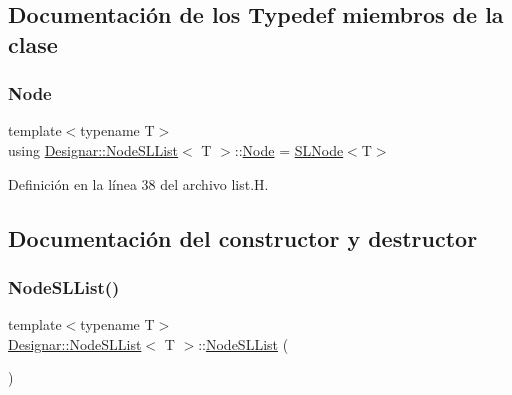 \subsection{Documentación de los \textquotesingle{}Typedef\textquotesingle{} miembros de la clase}
\mbox{\label{class_designar_1_1_node_s_l_list_a41963019ada1025099e3259207a3de96}} 
\subsubsection{\texorpdfstring{Node}{Node}}
{\footnotesize\ttfamily template$<$typename T$>$ \\
using \hyperlink{class_designar_1_1_node_s_l_list}{Designar\+::\+Node\+S\+L\+List}$<$ T $>$\+::\hyperlink{class_designar_1_1_node_s_l_list_a41963019ada1025099e3259207a3de96}{Node} =  \hyperlink{class_designar_1_1_s_l_node}{S\+L\+Node}$<$T$>$}



Definición en la línea 38 del archivo list.\+H.



\subsection{Documentación del constructor y destructor}
\mbox{\label{class_designar_1_1_node_s_l_list_a110541373e8c54e124136d6c82861e6b}} 
\subsubsection{\texorpdfstring{Node\+S\+L\+List()}{NodeSLList()}\hspace{0.1cm}{\footnotesize\ttfamily [1/3]}}
{\footnotesize\ttfamily template$<$typename T$>$ \\
\hyperlink{class_designar_1_1_node_s_l_list}{Designar\+::\+Node\+S\+L\+List}$<$ T $>$\+::\hyperlink{class_designar_1_1_node_s_l_list}{Node\+S\+L\+List} (\begin{DoxyParamCaption}{ }\end{DoxyParamCaption})\hspace{0.3cm}{\ttfamily [inline]}}



